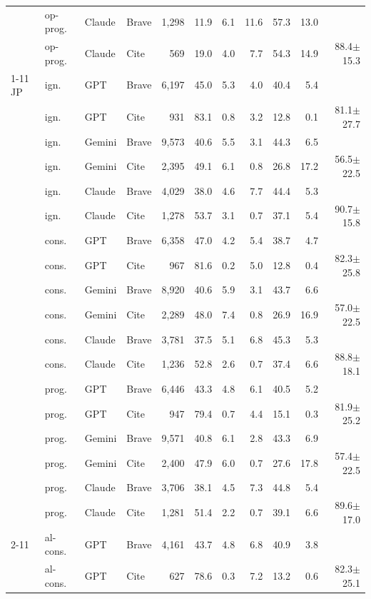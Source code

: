 \begin{table}[t]
\begin{tabular}{llllrrrrrrr}
 & op-prog. & Claude & Brave & 1{,}298 & 11.9 & 6.1 & 11.6 & 57.3 & 13.0 &  \\
 & op-prog. & Claude & Cite & 569 & 19.0 & 4.0 & 7.7 & 54.3 & 14.9 & 88.4$\pm$15.3 \\
\cmidrule(lr){1-11}
JP & ign. & GPT & Brave & 6{,}197 & 45.0 & 5.3 & 4.0 & 40.4 & 5.4 &  \\
 & ign. & GPT & Cite & 931 & 83.1 & 0.8 & 3.2 & 12.8 & 0.1 & 81.1$\pm$27.7 \\
 & ign. & Gemini & Brave & 9{,}573 & 40.6 & 5.5 & 3.1 & 44.3 & 6.5 &  \\
 & ign. & Gemini & Cite & 2{,}395 & 49.1 & 6.1 & 0.8 & 26.8 & 17.2 & 56.5$\pm$22.5 \\
 & ign. & Claude & Brave & 4{,}029 & 38.0 & 4.6 & 7.7 & 44.4 & 5.3 &  \\
 & ign. & Claude & Cite & 1{,}278 & 53.7 & 3.1 & 0.7 & 37.1 & 5.4 & 90.7$\pm$15.8 \\
 & cons. & GPT & Brave & 6{,}358 & 47.0 & 4.2 & 5.4 & 38.7 & 4.7 &  \\
 & cons. & GPT & Cite & 967 & 81.6 & 0.2 & 5.0 & 12.8 & 0.4 & 82.3$\pm$25.8 \\
 & cons. & Gemini & Brave & 8{,}920 & 40.6 & 5.9 & 3.1 & 43.7 & 6.6 &  \\
 & cons. & Gemini & Cite & 2{,}289 & 48.0 & 7.4 & 0.8 & 26.9 & 16.9 & 57.0$\pm$22.5 \\
 & cons. & Claude & Brave & 3{,}781 & 37.5 & 5.1 & 6.8 & 45.3 & 5.3 &  \\
 & cons. & Claude & Cite & 1{,}236 & 52.8 & 2.6 & 0.7 & 37.4 & 6.6 & 88.8$\pm$18.1 \\
 & prog. & GPT & Brave & 6{,}446 & 43.3 & 4.8 & 6.1 & 40.5 & 5.2 &  \\
 & prog. & GPT & Cite & 947 & 79.4 & 0.7 & 4.4 & 15.1 & 0.3 & 81.9$\pm$25.2 \\
 & prog. & Gemini & Brave & 9{,}571 & 40.8 & 6.1 & 2.8 & 43.3 & 6.9 &  \\
 & prog. & Gemini & Cite & 2{,}400 & 47.9 & 6.0 & 0.7 & 27.6 & 17.8 & 57.4$\pm$22.5 \\
 & prog. & Claude & Brave & 3{,}706 & 38.1 & 4.5 & 7.3 & 44.8 & 5.4 &  \\
 & prog. & Claude & Cite & 1{,}281 & 51.4 & 2.2 & 0.7 & 39.1 & 6.6 & 89.6$\pm$17.0 \\
\cmidrule(lr){2-11}
 & al-cons. & GPT & Brave & 4{,}161 & 43.7 & 4.8 & 6.8 & 40.9 & 3.8 &  \\
 & al-cons. & GPT & Cite & 627 & 78.6 & 0.3 & 7.2 & 13.2 & 0.6 & 82.3$\pm$25.1 \\

\end{tabular}
\end{table}
